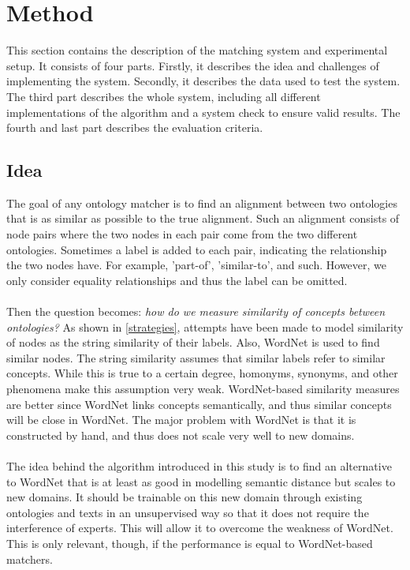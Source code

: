 \documentclass{article}
\begin{document}
 \newpage
 \section{Method} 
 This section contains the description of the matching system and experimental setup. It consists of four parts. Firstly, it describes the idea and challenges of implementing the system. Secondly, it describes the data used to test the system. The third part describes the whole system, including all different implementations of the algorithm and a system check to ensure valid results. The fourth and last part describes the evaluation criteria.
 
 \subsection{Idea}
The goal of any ontology matcher is to find an alignment between two ontologies that is as similar as possible to the true alignment. Such an alignment consists of node pairs where the two nodes in each pair come from the two different ontologies. Sometimes a label is added to each pair, indicating the relationship the two nodes have. For example, 'part-of', 'similar-to', and such. However, we only consider equality relationships and thus the label can be omitted.
 \paragraph{}
 Then the question becomes: \textit{how do we measure similarity of concepts between ontologies?} As shown in \ref{strategies}, attempts have been made to model similarity of nodes as the string similarity of their labels. Also, WordNet is used to find similar nodes. The string similarity assumes that similar labels refer to similar concepts. While this is true to a certain degree, homonyms, synonyms, and other phenomena make this assumption very weak. WordNet-based similarity measures are better since WordNet links concepts semantically, and thus similar concepts will be close in WordNet. The major problem with WordNet is that it is constructed by hand, and thus does not scale very well to new domains.
 \paragraph{}
 The idea behind the algorithm introduced in this study is to find an alternative to WordNet that is at least as good in modelling semantic distance but scales to new domains. It should be trainable on this new domain through existing ontologies and texts in an unsupervised way so that it does not require the interference of experts. This will allow it to overcome the weakness of WordNet. This is only relevant, though, if the performance is equal to WordNet-based matchers.
\end{document}

